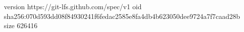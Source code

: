 version https://git-lfs.github.com/spec/v1
oid sha256:070d593dd08f84930241f6fedac2585e8fa4db4b623050dee9724a7f7caad28b
size 626416
